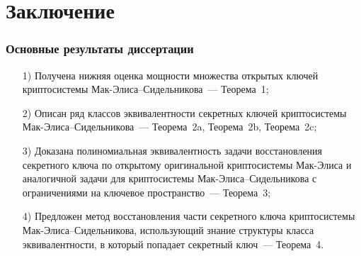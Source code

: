 
\section{Заключение}

\begin{frame}
\frametitle{Основные результаты диссертации}
\begin{itemize}
\item[1)] Получена нижняя оценка мощности множества открытых ключей криптосистемы Мак-Элиса--Сидельникова~--- \alert{Теорема~1};
\item[2)] Описан ряд классов эквивалентности секретных ключей криптосистемы Мак-Элиса--Сидельникова~--- \alert{Теорема~2a}, \alert{Теорема~2b}, \alert{Теорема~2c};
\item[3)] Доказана полиномиальная эквивалентность задачи восстановления секретного ключа по открытому оригинальной криптосистемы Мак-Элиса и аналогичной задачи для криптосистемы Мак-Элиса--Сидельникова с ограничениями на ключевое пространство~--- \alert{Теорема~3};
\item[4)] Предложен метод восстановления части секретного ключа криптосистемы Мак-Элиса--Сидельникова, использующий знание структуры класса эквивалентности, в который попадает секретный ключ~--- \alert{Теорема~4}.
\end{itemize}
\end{frame}
